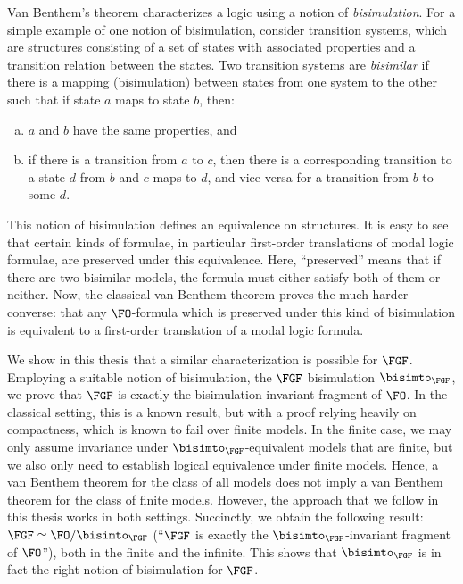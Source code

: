 Van Benthem's theorem characterizes a logic using a notion of \emph{bisimulation}.
For a simple example of one notion of bisimulation, consider transition systems, which are structures consisting of a set of states with associated properties and a transition relation between the states.
Two transition systems are \emph{bisimilar} if there is a mapping (bisimulation) between states from one system to the other such that if state $a$ maps to state $b$, then:
\begin{enumerate}[(a)]
  \item $a$ and $b$ have the same properties, and
  \item if there is a transition from $a$ to $c$, then there is a corresponding transition to a state $d$ from $b$ and $c$ maps to $d$, and vice versa for a transition from $b$ to some $d$.
\end{enumerate}
This notion of bisimulation defines an equivalence on structures.
It is easy to see that certain kinds of formulae, in particular first-order translations of modal logic formulae, are preserved under this equivalence.
Here, ``preserved'' means that if there are two bisimilar models, the formula must either satisfy both of them or neither.
Now, the classical van Benthem theorem\cite{van1983modal} proves the much harder converse: that any $\FO$-formula which is preserved under this kind of bisimulation is equivalent to a first-order translation of a modal logic formula.

We show in this thesis that a similar characterization is possible for $\FGF$.
Employing a suitable notion of bisimulation, the $\FGF$ bisimulation $\bisimto_{\FGF}$, we prove that $\FGF$ is exactly the bisimulation invariant fragment of $\FO$.
In the classical setting, this is a known result\cite{BednarczykJ22}, but with a proof relying heavily on compactness, which is known to fail over finite models.
In the finite case, we may only assume invariance under $\bisimto_{\FGF}$-equivalent models that are finite, but we also only need to establish logical equivalence under finite models.
Hence, a van Benthem theorem for the class of all models does not imply a van Benthem theorem for the class of finite models.
However, the approach that we follow in this thesis works in both settings.
Succinctly, we obtain the following result: $\FGF \simeq \FO/{\bisimto_{\FGF}}$ (``$\FGF$ is exactly the $\bisimto_{\FGF}$-invariant fragment of $\FO$''), both in the finite and the infinite.
This shows that $\bisimto_{\FGF}$ is in fact the right notion of bisimulation for $\FGF$.

